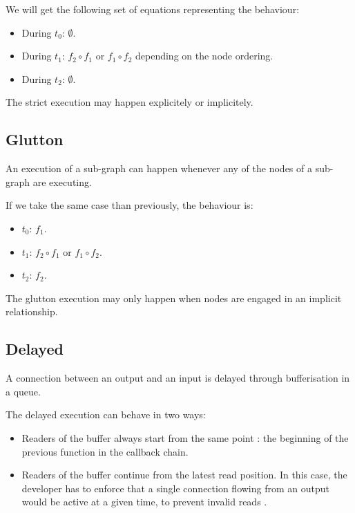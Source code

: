 \documentclass{article}
\begin{document}
    We will get the following set of equations representing the behaviour: 
    \begin{itemize}
        \item During $t_0$: $\emptyset$.
        \item During $t_1$: $f_2 \circ f_1 $ or $f_1 \circ f_2$ depending on the node ordering.
        \item During $t_2$: $\emptyset$. 
    \end{itemize}

    The strict execution may happen explicitely or implicitely.
    
	\subsection{Glutton}
	An execution of a sub-graph can happen whenever any of the nodes of a sub-graph are executing. 
    
    If we take the same case than previously, the behaviour is:
    \begin{itemize}
        \item $t_0$: $f_1$.
        \item $t_1$: $f_2 \circ f_1$ or $f_1 \circ f_2$.
        \item $t_2$: $f_2$. 
    \end{itemize}

    The glutton execution may only happen when nodes are engaged in an implicit relationship.
    
	\subsection{Delayed}
	A connection between an output and an input is delayed through bufferisation in a queue.
	
	The delayed execution can behave in two ways:
	\begin{itemize}
		\item Readers of the buffer always start from the same point : the beginning of the previous function in the callback chain.
		\item Readers of the buffer continue from the latest read position.
        In this case, the developer has to enforce that a single connection flowing from an output would be active at a given time, to prevent invalid reads .%
	\end{itemize}
	
    
\end{document}
